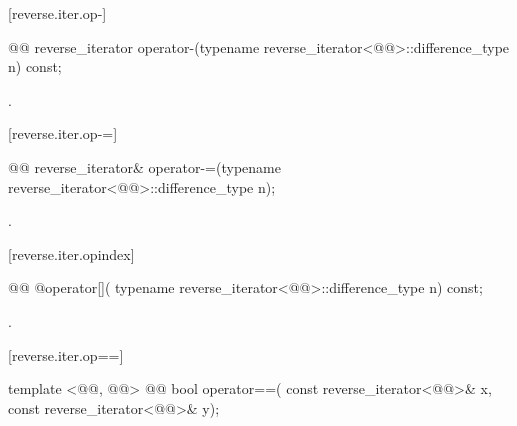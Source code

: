 [reverse.iter.op-]{}

%
\begin{itemdecl}
@@
reverse_iterator
operator-(typename reverse_iterator<@@>::difference_type n) const;
\end{itemdecl}

\begin{itemdescr}
\pnum
\returns
{}.
\end{itemdescr}

[reverse.iter.op-=]{}

%
\begin{itemdecl}
@@
reverse_iterator&
operator-=(typename reverse_iterator<@@>::difference_type n);
\end{itemdecl}

\begin{itemdescr}
\pnum
\effects
{}

\pnum
\returns
{}.
\end{itemdescr}

[reverse.iter.opindex]{}

%
\begin{itemdecl}
@@
@\unspec@ operator[](
    typename reverse_iterator<@@>::difference_type n) const;
\end{itemdecl}

\begin{itemdescr}
\pnum
\returns
{}.
\end{itemdescr}

[reverse.iter.op==]{}

%
\begin{itemdecl}
template <@@, @@>
    @@
  bool operator==(
    const reverse_iterator<@@>& x,
    const reverse_iterator<@@>& y);
\end{itemdecl}

